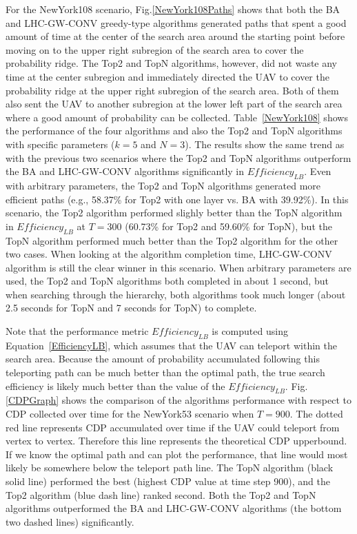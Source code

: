 \documentclass[journal]{IEEEtran}
\begin{document}
For the NewYork108 scenario, Fig.\ref{NewYork108Paths} shows that both the BA and LHC-GW-CONV greedy-type algorithms generated paths that spent a good amount of time at the center of the search area around the starting point before moving on to the upper right subregion of the search area to cover the probability ridge. The Top2 and TopN algorithms, however, did not waste any time at the center subregion and immediately directed the UAV to cover the probability ridge at the upper right subregion of the search area. Both of them also sent the UAV to another subregion at the lower left part of the search area where a good amount of probability can be collected. Table~\ref{NewYork108} shows the performance of the four algorithms and also the Top2 and TopN algorithms with specific parameters ($k=5$ and $N=3$). The results show the same trend as with the previous two scenarios where the Top2 and TopN algorithms outperform the BA and LHC-GW-CONV algorithms significantly in $\mathit{Efficiency_{LB}}$. Even with arbitrary parameters, the Top2 and TopN algorithms generated more efficient paths (e.g., 58.37\% for Top2 with one layer vs. BA with 39.92\%). In this scenario, the Top2 algorithm performed slighly better than the TopN algorithm in $\mathit{Efficiency_{LB}}$ at $T=300$ (60.73\% for Top2 and 59.60\% for TopN), but the TopN algorithm performed much better than the Top2 algorithm for the other two cases. When looking at the algorithm completion time, LHC-GW-CONV algorithm is still the clear winner in this scenario. When arbitrary parameters are used, the Top2 and TopN algorithms both completed in about 1 second, but when searching through the hierarchy, both algorithms took much longer (about 2.5 seconds for TopN and 7 seconds for TopN) to complete.


Note that the performance metric $\mathit{Efficiency_{LB}}$ is computed using Equation~\ref{EfficiencyLB}, which assumes that the UAV can teleport within the search area. Because the amount of probability accumulated following this teleporting path can be much better than the optimal path, the true search efficiency is likely much better than the value of the $\mathit{Efficiency_{LB}}$. Fig.\ref{CDPGraph} shows the comparison of the algorithms performance with respect to CDP collected over time for the NewYork53 scenario when $T=900$. The dotted red line represents CDP accumulated over time if the UAV could teleport from vertex to vertex. Therefore this line represents the theoretical CDP upperbound. If we know the optimal path and can plot the performance, that line would most likely be somewhere below the teleport path line. The TopN algorithm (black solid line) performed the best (highest CDP value at time step 900), and the Top2 algorithm (blue dash line) ranked second. Both the Top2 and TopN algorithms outperformed the BA and LHC-GW-CONV algorithms (the bottom two dashed lines) significantly.
\end{document}
